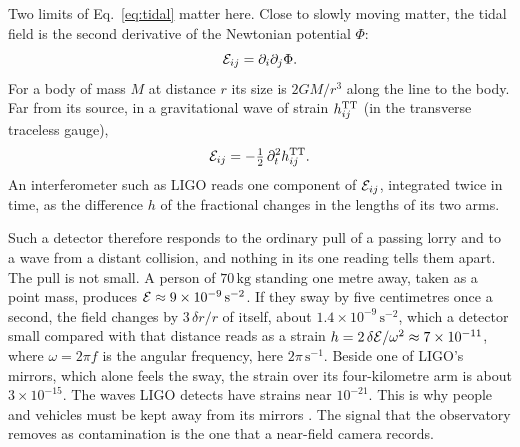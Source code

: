 Two limits of Eq.~\eqref{eq:tidal} matter here. Close to slowly moving matter,
the tidal field is the second derivative of the Newtonian potential $\Phi$:
\begin{equation}\label{eq:newton}
\mathcal{E}_{ij} = \partial_i \partial_j \Phi .
\end{equation}
For a body of mass $M$ at distance $r$ its size is $2GM/r^3$ along the line to
the body. Far from its source, in a gravitational wave of strain
$h_{ij}^{\mathrm{TT}}$ (in the transverse traceless gauge),
\begin{equation}\label{eq:wave}
\mathcal{E}_{ij} = -\tfrac{1}{2}\,\partial_t^2 h_{ij}^{\mathrm{TT}} .
\end{equation}
An interferometer such as LIGO reads one component of $\mathcal{E}_{ij}$, integrated
twice in time, as the difference $h$ of the fractional changes in the lengths
of its two arms.

Such a detector therefore responds to the ordinary pull of a passing lorry and
to a wave from a distant collision, and nothing in its one reading tells them
apart. The pull is not small. A person of $70\,\mathrm{kg}$ standing one metre
away, taken as a point mass, produces $\mathcal{E} \approx 9\times10^{-9}\,\mathrm{s^{-2}}$. If they sway by
five centimetres once a second, the field changes by $3\,\delta r/r$ of
itself, about $1.4\times10^{-9}\,\mathrm{s^{-2}}$, which a detector small compared
with that distance reads as a
strain $h = 2\,\delta\mathcal{E}/\omega^2 \approx 7\times10^{-11}$, where
$\omega = 2\pi f$ is the angular frequency, here $2\pi\,\mathrm{s^{-1}}$.
Beside one of LIGO's mirrors, which alone feels the sway, the strain over its
four-kilometre arm is about $3\times10^{-15}$. The
waves LIGO detects have strains near $10^{-21}$. This is why people and
vehicles must be kept away from its mirrors \cite{ThorneWinstein1999}. The
signal that the observatory removes as contamination is the one that a
near-field camera records.

